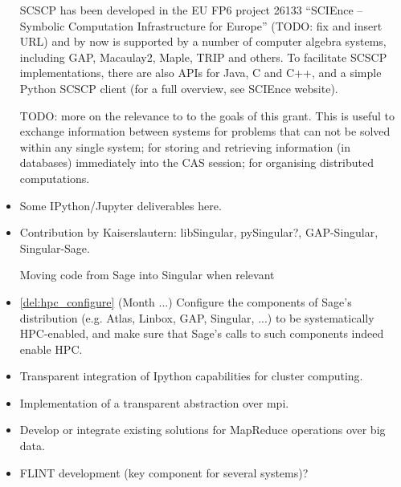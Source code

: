\begin{Workpackage}{\thewpno}
\begin{WPDeliverables}
\begin{itemize}
        SCSCP has been developed in the EU FP6 project 26133 ``SCIEnce -- Symbolic
        Computation Infrastructure for Europe'' (TODO: fix and insert URL) and by 
        now is supported by a number of computer algebra systems, including GAP, 
        Macaulay2, Maple, TRIP and others. To facilitate SCSCP implementations, 
        there are also APIs for Java, C and C++, and a simple Python SCSCP client
        (for a full overview, see SCIEnce website).
        
        TODO: more on the relevance to to the goals of this grant. This is useful 
        to exchange information between systems for problems that can not be solved
        within any single system; for storing and retrieving information (in databases)
        immediately into the CAS session; for organising distributed computations.


    \item Some IPython/Jupyter deliverables here.

    \item Contribution by Kaiserslautern: libSingular, pySingular?,
      GAP-Singular, Singular-Sage.

      Moving code from Sage into Singular when relevant


    \item \ref{del:hpc_configure} (Month ...) Configure the components of
      Sage's distribution (e.g. Atlas, Linbox, GAP, Singular, ...) to be
      systematically HPC-enabled, and make sure that Sage's calls to such
      components indeed enable HPC.


    \item Transparent integration of Ipython capabilities for cluster computing.
    \item Implementation of a transparent abstraction over mpi.
    \item Develop or integrate existing solutions for MapReduce operations
      over big data.

    \item FLINT development (key component for several systems)?


\end{itemize}
\end{WPDeliverables}
\end{Workpackage}

